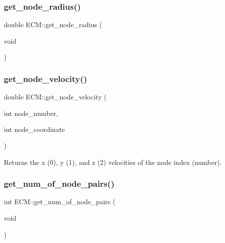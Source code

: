 \mbox{\label{classECM_a59c396242e1f2a7992bcb3744c27d280}} 
\subsubsection{\texorpdfstring{get\_node\_radius()}{get\_node\_radius()}}
{\footnotesize\ttfamily double E\+C\+M\+::get\+\_\+node\+\_\+radius (\begin{DoxyParamCaption}\item[{void}]{ }\end{DoxyParamCaption})\hspace{0.3cm}{\ttfamily [inline]}}

\mbox{\label{classECM_af327509a64d2220a505c16e9997e78c1}} 
\subsubsection{\texorpdfstring{get\_node\_velocity()}{get\_node\_velocity()}}
{\footnotesize\ttfamily double E\+C\+M\+::get\+\_\+node\+\_\+velocity (\begin{DoxyParamCaption}\item[{int}]{node\+\_\+number,  }\item[{int}]{node\+\_\+coordinate }\end{DoxyParamCaption})\hspace{0.3cm}{\ttfamily [inline]}}

Returns the x (0), y (1), and z (2) velocities of the node index (number). \mbox{\label{classECM_aadeaefad8e0e1ca296249ed4c8a5ade9}} 
\subsubsection{\texorpdfstring{get\_num\_of\_node\_pairs()}{get\_num\_of\_node\_pairs()}}
{\footnotesize\ttfamily int E\+C\+M\+::get\+\_\+num\+\_\+of\+\_\+node\+\_\+pairs (\begin{DoxyParamCaption}\item[{void}]{ }\end{DoxyParamCaption})\hspace{0.3cm}{\ttfamily [inline]}}

